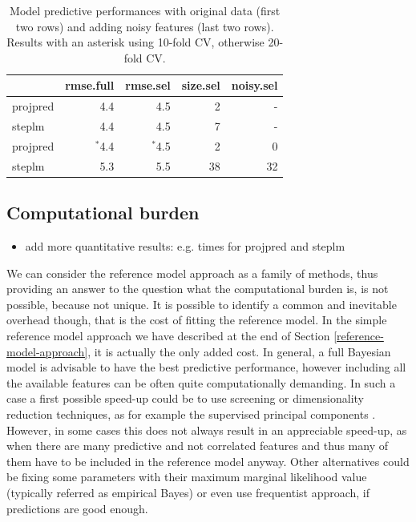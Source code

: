 \documentclass[american,]{article}
\theoremstyle{definition}
\begin{document}
\begin{table}[tp]
\scriptsize
\centering
\begin{tabular}{l|r|r|r|r}
  \hline
 & rmse.full & rmse.sel & size.sel & noisy.sel \\ 
  \hline
projpred & 4.4 & 4.5 & 2 & -  \\
steplm & 4.4 & 4.5 & 7 & - \\
\hline
\hline
projpred & $^{*}$4.4 & $^{*}$4.5 & 2 & 0  \\
steplm & 5.3 & 5.5 & 38 & 32 \\
   \hline
\end{tabular}
\caption{Model predictive performances with original data (first two rows) and adding noisy features (last two rows). Results with an asterisk using 10-fold CV, otherwise 20-fold CV.}
\label{tab:model_performances}
\end{table}

\hypertarget{computational-burden}{%
\subsection{Computational burden} \label{computational-burden}}

\begin{itemize}
\item add more quantitative results: e.g. times for projpred and steplm
\end{itemize}

We can consider the reference model approach as a family of methods, thus providing an answer to the question what the computational burden is, is not possible, because not unique. It is possible to identify a common and inevitable overhead though, that is the cost of fitting the reference model. In the simple reference model approach we have described at the end of Section \ref{reference-model-approach}, it is actually the only added cost. In general, a full Bayesian model is advisable to have the best predictive performance, however including all the available features can be often quite computationally demanding. In such a case a first possible speed-up could be to use screening or dimensionality reduction techniques, as for example the supervised principal components \citep{paper:original_spc,paper:piironen_spc}. However, in some cases this does not always result in an appreciable speed-up, as when there are many predictive and not correlated features and thus many of them have to be included in the reference model anyway. Other alternatives could be fixing some parameters with their maximum marginal likelihood value (typically referred as empirical Bayes) or even use frequentist approach, if predictions are good enough.
\end{document}
